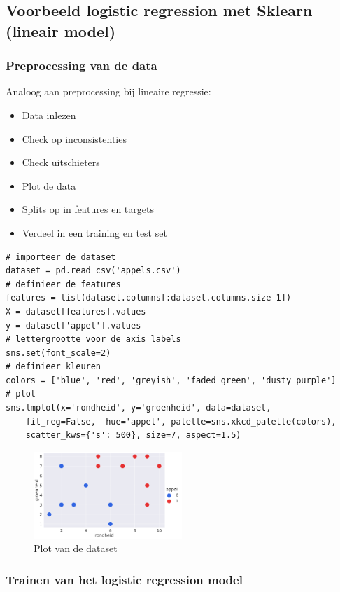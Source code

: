 \documentclass{article}
\begin{document}
\subsection{Voorbeeld logistic regression met Sklearn (lineair model)}

\subsubsection{Preprocessing van de data}

Analoog aan preprocessing bij lineaire regressie:

\begin{itemize}
    \item Data inlezen
    \item Check op inconsistenties
    \item Check uitschieters
    \item Plot de data
    \item Splits op in features en targets
    \item Verdeel in een training en test set
\end{itemize}

\begin{verbatim}
# importeer de dataset
dataset = pd.read_csv('appels.csv')
# definieer de features
features = list(dataset.columns[:dataset.columns.size-1])
X = dataset[features].values
y = dataset['appel'].values
# lettergrootte voor de axis labels
sns.set(font_scale=2) 
# definieer kleuren
colors = ['blue', 'red', 'greyish', 'faded_green', 'dusty_purple']
# plot
sns.lmplot(x='rondheid', y='groenheid', data=dataset, 
    fit_reg=False,  hue='appel', palette=sns.xkcd_palette(colors), 
    scatter_kws={'s': 500}, size=7, aspect=1.5)
\end{verbatim}

\begin{figure}[H]
    \centering
    \includegraphics[width=0.5\textwidth]{logistic-sklearn-preprocessing.png}
    \caption{Plot van de dataset}
\end{figure}


\subsubsection{Trainen van het logistic regression model}
\end{document}
